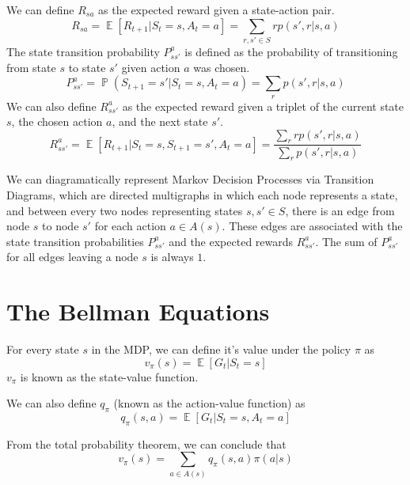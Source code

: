\documentclass[12pt]{report}
\begin{document}
We can define $R_{sa}$ as the expected reward given a state-action pair.
\begin{equation}
    R_{sa} = \mathop{\mathbb{E}}\left[R_{t + 1} | S_{t} = s, A_{t} = a\right] = \sum\limits_{r, s' \in S} r p(s', r | s, a)
\end{equation}
The state transition probability $P_{ss'}^{a}$ is defined as the probability of transitioning from state $s$ to state $s'$ given action $a$ was chosen.
\begin{equation}
    P_{ss'}^{a} = \mathop{\mathbb{P}}(S_{t + 1} = s' | S_{t} = s, A_{t} = a) = \sum\limits_{r} p(s', r | s, a)
\end{equation}
We can also define $R_{ss'}^{a}$ as the expected reward given a triplet of the current state $s$, the chosen action $a$, and the next state $s'$.
\begin{equation}
    R_{ss'}^{a} = \mathop{\mathbb{E}}\left[R_{t + 1} | S_{t} = s, S_{t + 1} = s', A_{t} = a\right] = \frac{\sum\limits_{r} r p(s', r | s, a)}{\sum\limits_{r} p(s', r | s, a)}
\end{equation}

We can diagramatically represent Markov Decision Processes via Transition Diagrams, which are directed multigraphs in which each node represents a state, and between every two nodes representing states 
$s, s' \in S$, there is an edge from node $s$ to node $s'$ for each action $a \in A(s)$. These edges are associated with the state transition probabilities $P_{ss'}^{a}$ and the expected rewards $R_{ss'}^{a}$.
The sum of $P_{ss'}^{a}$ for all edges leaving a node $s$ is always $1$.

\section{The Bellman Equations}
For every state $s$ in the MDP, we can define it's value under the policy $\pi$ as 
\begin{equation}
    v_{\pi}(s) = \mathop{\mathbb{E}}\left[G_{t} | S_{t} = s\right]
\end{equation}
$v_{\pi}$ is known as the state-value function.

We can also define $q_{\pi}$ (known as the action-value function) as 
\begin{equation}
    q_{\pi}(s, a) = \mathop{\mathbb{E}}\left[G_{t} | S_{t} = s, A_{t} = a\right]
\end{equation}

From the total probability theorem, we can conclude that 
\begin{equation}
    v_{\pi}(s) = \sum\limits_{a \in A(s)} q_{\pi}(s, a)\pi(a | s)
\end{equation}
\end{document}
